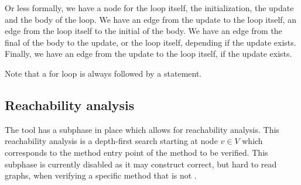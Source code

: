 Or less formally, we have a node for the loop itself, the initialization, the 
update and the body of the loop. We have an edge from the update to the loop
itself, an edge from the loop itself to the initial of the body. We have an edge from
the final of the body to the update, or the loop itself, depending if the update
exists. Finally, we have an edge from the update to the loop itself, if the update
exists.

Note that a for loop is always followed by a 
statement.

\subsection{Reachability analysis}
The tool has a subphase in place which allows for reachability analysis. This
reachability analysis is a depth-first search starting at node $v \in V$ which
corresponds to the method entry point of the method to be verified. This subphase
is currently disabled as it may construct correct, but hard to read graphs, when
verifying a specific method that is not .
